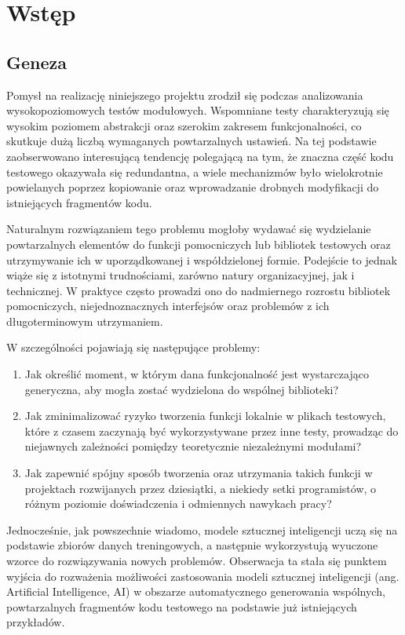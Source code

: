\section{Wstęp}

\subsection{Geneza}

Pomysł na realizację niniejszego projektu zrodził się podczas analizowania wysokopoziomowych testów modułowych. Wspomniane testy charakteryzują się wysokim poziomem abstrakcji oraz szerokim zakresem funkcjonalności, co skutkuje dużą liczbą wymaganych powtarzalnych ustawień. Na tej podstawie zaobserwowano interesującą tendencję polegającą na tym, że znaczna część kodu testowego okazywała się redundantna, a wiele mechanizmów było wielokrotnie powielanych poprzez kopiowanie oraz wprowadzanie drobnych modyfikacji do istniejących fragmentów kodu.

Naturalnym rozwiązaniem tego problemu mogłoby wydawać się wydzielanie powtarzalnych elementów do funkcji pomocniczych lub bibliotek testowych oraz utrzymywanie ich w uporządkowanej i współdzielonej formie. Podejście to jednak wiąże się z istotnymi trudnościami, zarówno natury organizacyjnej, jak i technicznej. W praktyce często prowadzi ono do nadmiernego rozrostu bibliotek pomocniczych, niejednoznacznych interfejsów oraz problemów z ich długoterminowym utrzymaniem.

W szczególności pojawiają się następujące problemy:
\begin{enumerate}
  \item Jak określić moment, w którym dana funkcjonalność jest wystarczająco generyczna, aby mogła zostać wydzielona do wspólnej biblioteki?
  \item Jak zminimalizować ryzyko tworzenia funkcji lokalnie w plikach testowych, które z czasem zaczynają być wykorzystywane przez inne testy, prowadząc do niejawnych zależności pomiędzy teoretycznie niezależnymi modułami?
  \item Jak zapewnić spójny sposób tworzenia oraz utrzymania takich funkcji w projektach rozwijanych przez dziesiątki, a niekiedy setki programistów, o różnym poziomie doświadczenia i odmiennych nawykach pracy?
\end{enumerate}

Jednocześnie, jak powszechnie wiadomo, modele sztucznej inteligencji uczą się na podstawie zbiorów danych treningowych, a następnie wykorzystują wyuczone wzorce do rozwiązywania nowych problemów. Obserwacja ta stała się punktem wyjścia do rozważenia możliwości zastosowania modeli sztucznej inteligencji (ang. Artificial Intelligence, AI) w obszarze automatycznego generowania wspólnych, powtarzalnych fragmentów kodu testowego na podstawie już istniejących przykładów.

